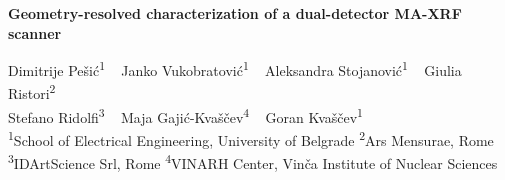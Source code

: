 \documentclass[portrait]{Hylangtechposter}
\begin{document}
\printheader

\begin{center}

\textbf{\bf\veryHuge\color{posterblue}Geometry-resolved characterization of a
dual-detector MA-XRF scanner \\[1.0cm]}

\huge
Dimitrije Pe\v{s}i\'{c}\textsuperscript{1} ~
Janko Vukobratovi\'{c}\textsuperscript{1} ~
Aleksandra Stojanovi\'{c}\textsuperscript{1} ~
Giulia Ristori\textsuperscript{2} \\[0.2cm]
Stefano Ridolfi\textsuperscript{3} ~
Maja Gaji\'{c}-Kva\v{s}\v{c}ev\textsuperscript{4} ~
Goran Kva\v{s}\v{c}ev\textsuperscript{1} \\[0.35cm]

\Large
\textsuperscript{1}School of Electrical Engineering, University of Belgrade \quad
\textsuperscript{2}Ars Mensurae, Rome \\[0.15cm]
\textsuperscript{3}IDArtScience Srl, Rome \quad
\textsuperscript{4}VINARH Center, Vin\v{c}a Institute of Nuclear Sciences

\end{center}

\vspace{1cm}

\large
\end{document}
